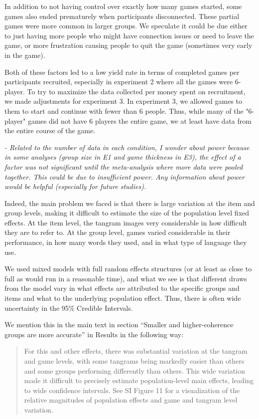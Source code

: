 \documentclass{stanfordletter}
\newcommand{\theysaid}[1]{\begin{leftbar} \noindent 
		\textsl{ #1}\end{leftbar}}
\newcommand{\revised}[1]{\begin{quote}	#1 \end{quote}}
\begin{document}
\begin{letter}{}
{          	In addition to not having control over exactly how many games started, some games also ended prematurely when participants disconnected. These partial games were more common in larger groups. We speculate it could be due either to just having more people who might have connection issues or need to leave the game, or more frustration causing people to quit the game (sometimes very early in the game). 
          	
          	Both of these factors led to a low yield rate in terms of completed games per participants recruited, especially in experiment 2 where all the games were 6-player. To try to maximize the data collected per money spent on recruitment, we made adjustments for experiment 3. 
          	In experiment 3, we allowed games to them to start and continue with fewer than 6 people. Thus, while many of the "6-player" games did not have 6 players the entire game, we at least have data from the entire course of the game. }
          
          
          \theysaid{- Related to the number of data in each condition, I wonder about power because in some analyses (group size in E1 and game thickness in E3), the effect of a factor was not significant until the meta-analysis where more data were pooled together. This could be due to insufficient power. Any information about power would be helpful (especially for future studies).}
                   
          Indeed, the main problem we faced is that there is large variation at the item and group levels, making it difficult to estimate the size of the population level fixed effects. At the item level, the tangram images very considerable in how difficult they are to refer to. At the group level, games varied considerable in their performance, in how many words they used, and in what type of language they use. 
          
          We used mixed models with full random effects structures (or at least as close to full as would run in a reasonable time), and what we see is that different draws from the model vary in what effects are attributed to the specific groups and items and what to the underlying population effect. Thus, there is often wide uncertainty in the 95\% Credible Intervals. 
          
          We mention this in the main text in section ``Smaller and higher-coherence groups are more accurate'' in Results in the following way: 
          \revised{For this and other effects, there was substantial variation at the tangram and game levels, with some tangrams being markedly easier than others and some groups performing differently than others. This wide variation made it difficult to precisely estimate population-level main effects, leading to wide confidence intervals. See SI Figure 11 for a visualization of the relative magnitudes of population effects and game and tangram level variation.}
          

\end{letter}
\end{document}
